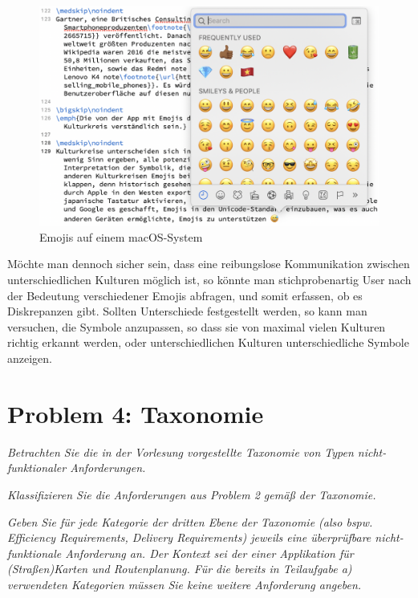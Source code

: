 \documentclass[
  ngerman,
  DIV=14
]{scrartcl}
\begin{document}
\begin{figure}[!t]
\centering
\includegraphics[width=0.75\linewidth]{emojis}
\caption{Emojis auf einem macOS-System}
\label{fig:emojis}
\end{figure}

Möchte man dennoch sicher sein, dass eine reibungslose Kommunikation zwischen unterschiedlichen Kulturen möglich ist, so könnte man stichprobenartig User nach der Bedeutung verschiedener Emojis abfragen, und somit erfassen, ob es Diskrepanzen gibt. Sollten Unterschiede festgestellt werden, so kann man versuchen, die Symbole anzupassen, so dass sie von maximal vielen Kulturen richtig erkannt werden, oder unterschiedlichen Kulturen unterschiedliche Symbole anzeigen. 

\section*{Problem 4: Taxonomie}

\emph{Betrachten Sie die in der Vorlesung vorgestellte Taxonomie von Typen nicht-funktionaler Anforderungen.}

\medskip\noindent
\emph{Klassifizieren Sie die Anforderungen aus Problem 2 gemäß der Taxonomie.}

\bigskip\noindent
\emph{Geben Sie für jede Kategorie der dritten Ebene der Taxonomie (also bspw. Efficiency Requirements, Delivery Requirements) jeweils eine überprüfbare nicht-funktionale Anforderung an. Der Kontext sei der einer Applikation für (Straßen)Karten und Routenplanung. Für die bereits in Teilaufgabe a) verwendeten Kategorien müssen Sie keine weitere Anforderung angeben.}
\end{document}
